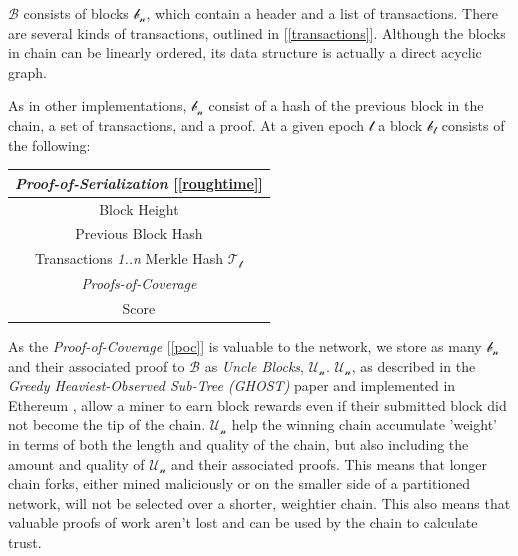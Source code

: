 \documentclass[letterpaper,11pt]{article}
\begin{document}
$\mathcal{B}$ consists of blocks $\mathcal{b_n}$, which contain a header and a list of transactions. There are several kinds of transactions, outlined in [\ref{transactions}]. Although the blocks in chain can be linearly ordered, its data structure is actually a direct acyclic graph.\newline

As in other implementations, $\mathcal{b_n}$ consist of a hash of the previous block in the chain, a set of transactions, and a proof. At a given epoch $\mathcal{t}$ a block $\mathcal{b_t}$ consists of the following:

\begin{center}
	\begin{tabular}{|c|}
		\hline
		 \textit{Proof-of-Serialization} [\ref{roughtime}]\\
		 \hline
		 Block Height \\
		\hline
		 Previous Block Hash \\
		 \hline
		 Transactions \textit{1..n} Merkle Hash $\mathcal{T_t}$ \\
		 \hline
		 \textit{Proofs-of-Coverage} \\
		 \hline
		 Score \\
		 \hline
	\end{tabular}
\end{center}

As the \textit{Proof-of-Coverage} [\ref{poc}] is valuable to the network, we store as many $\mathcal{b_n}$ and their associated proof to $\mathcal{B}$ as \textit{Uncle Blocks}, $\mathcal{U_n}$. $\mathcal{U_n}$, as described in the \textit{Greedy Heaviest-Observed Sub-Tree (GHOST)} \cite{ghost} paper and implemented in Ethereum \cite{ethereum}, allow a miner to earn block rewards even if their submitted block did not become the tip of the chain. $\mathcal{U_n}$ help the winning chain accumulate 'weight' in terms of both the length and quality of the chain, but also including the amount and quality of $\mathcal{U_n}$ and their associated proofs. This means that longer chain forks, either mined maliciously or on the smaller side of a partitioned network, will not be selected over a shorter, weightier chain. This also means that valuable proofs of work aren't lost and can be used by the chain to calculate trust.\newline
\end{document}
